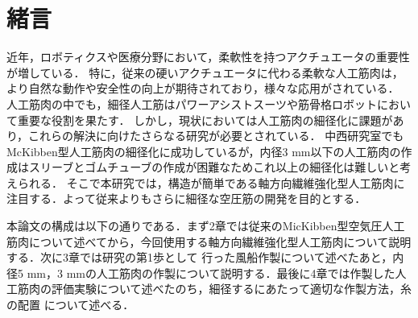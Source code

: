\newpage
\setcounter{page}{1}
\section{緒言}
近年，ロボティクスや医療分野において，柔軟性を持つアクチュエータの重要性が増している．
特に，従来の硬いアクチュエータに代わる柔軟な人工筋肉は，より自然な動作や安全性の向上が期待されており，様々な応用がされている．
人工筋肉の中でも，細径人工筋はパワーアシストスーツや筋骨格ロボットにおいて重要な役割を果たす\cite{1}．
しかし，現状においては人工筋肉の細径化に課題があり，これらの解決に向けたさらなる研究が必要とされている．
中西研究室でもMcKibben型人工筋肉の細径化に成功しているが\cite{2}，内径3 mm以下の人工筋肉の作成はスリーブとゴムチューブの作成が困難なためこれ以上の細径化は難しいと考えられる．
そこで本研究では，構造が簡単である軸方向繊維強化型人工筋肉\cite{3}に注目する．よって従来よりもさらに細径な空圧筋の開発を目的とする．

本論文の構成は以下の通りである．まず2章では従来のMicKibben型空気圧人工筋肉について述べてから，今回使用する軸方向繊維強化型人工筋肉について説明する．次に3章では研究の第1歩として
行った風船作製について述べたあと，内径5 mm，3 mmの人工筋肉の作製について説明する．最後に4章では作製した人工筋肉の評価実験について述べたのち，細径するにあたって適切な作製方法，糸の配置
について述べる．